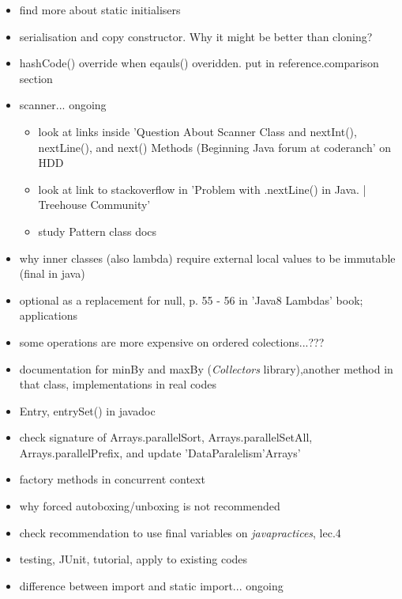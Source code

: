 \documentclass{report}
\begin{document}
\begin{itemize}
	\item find more about static initialisers
	\item serialisation and copy constructor. Why it might be better than cloning?
	\item hashCode() override when eqauls() overidden. put in reference.comparison section
	\item scanner... ongoing
	\begin{itemize}
		\item look at links inside 'Question About Scanner Class and nextInt(), nextLine(), and next() Methods (Beginning Java forum at coderanch' on HDD
		\item look at link to stackoverflow in 'Problem with .nextLine() in Java. | Treehouse Community'
		\item study Pattern class docs
	\end{itemize}

	\item why inner classes (also lambda) require external local values  to be immutable (final in java)
	\item  optional as a replacement for null, p. 55 - 56 in 'Java8 Lambdas' book; applications
	\item some operations are more expensive on ordered colections...???
	\item documentation for minBy and maxBy (\textit{Collectors} library),another method in that class, implementations in real codes
	\item Entry, entrySet() in javadoc
	\item check signature of Arrays.parallelSort, Arrays.parallelSetAll, 
    Arrays.parallelPrefix, and update 'DataParalelism'Arrays'
	\item factory methods in concurrent context
	\item why forced autoboxing/unboxing is not recommended
	\item check recommendation to use final variables on \textit{javapractices}, lec.4
	\item  testing, JUnit, tutorial, apply to existing codes
	\item difference between import and static import... ongoing
\end{itemize}
\end{document}
